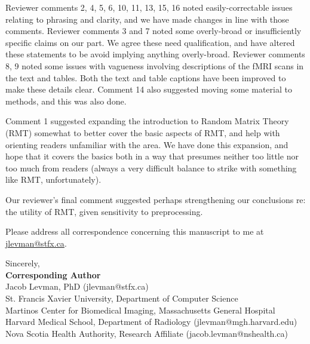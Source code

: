 \documentclass[10pt,letter]{article}
\begin{document}
Reviewer comments 2, 4, 5, 6, 10, 11, 13, 15, 16 noted easily-correctable
issues relating to phrasing and clarity, and we have made changes in line with
those comments. Reviewer comments 3 and 7 noted some overly-broad or
insufficiently specific claims on our part. We agree these need qualification,
and have altered these statements to be avoid implying anything overly-broad.
Reviewer comments 8, 9 noted some issues with vagueness involving descriptions
of the fMRI scans in the text and tables. Both the text and table captions have
been improved to make these details clear. Comment 14 also suggested moving some
material to methods, and this was also done.

Comment 1 suggested expanding the introduction to Random Matrix Theory (RMT)
somewhat to better cover the basic aspects of RMT, and help with orienting
readers unfamiliar with the area. We have done this expansion, and hope that it
covers the basics both in a way that presumes neither too little nor too much
from readers (always a very difficult balance to strike with something like
RMT, unfortunately).

Our reviewer's final comment suggested perhaps strengthening our conclusions
re: the utility of RMT, given sensitivity to preprocessing.




Please address all correspondence concerning this manuscript to me at \href{jlevman@stfx.ca}{jlevman@stfx.ca}.







\bigskip

\noindent
Sincerely, \\

\small
\noindent
\textbf{Corresponding Author}\\
Jacob Levman, PhD (jlevman@stfx.ca) \\
\footnotesize
\hspace*{0.25cm}St. Francis Xavier University, Department of Computer Science  \\
\hspace*{0.25cm}Martinos Center for Biomedical Imaging, Massachusetts General Hospital \\
\hspace*{0.25cm}Harvard Medical School, Department of Radiology (jlevman@mgh.harvard.edu) \\
\hspace*{0.25cm}Nova Scotia Health Authority, Research Affiliate (jacob.levman@nshealth.ca) \\
\normalsize
\end{document}
